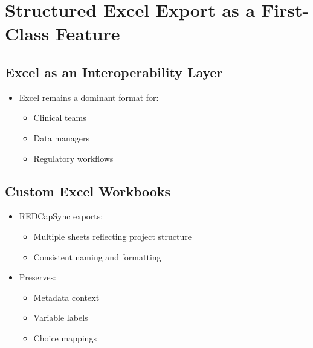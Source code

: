 \section{Structured Excel Export as a First-Class Feature}\label{structured-excel-export-as-a-first-class-feature}

\subsection{Excel as an Interoperability Layer}\label{excel-as-an-interoperability-layer}

\begin{itemize}
\tightlist
\item
  Excel remains a dominant format for:

  \begin{itemize}
  \tightlist
  \item
    Clinical teams\\
  \item
    Data managers\\
  \item
    Regulatory workflows
  \end{itemize}
\end{itemize}

\subsection{Custom Excel Workbooks}\label{custom-excel-workbooks}

\begin{itemize}
\tightlist
\item
  REDCapSync exports:

  \begin{itemize}
  \tightlist
  \item
    Multiple sheets reflecting project structure\\
  \item
    Consistent naming and formatting\\
  \end{itemize}
\item
  Preserves:

  \begin{itemize}
  \tightlist
  \item
    Metadata context\\
  \item
    Variable labels\\
  \item
    Choice mappings
  \end{itemize}
\end{itemize}

